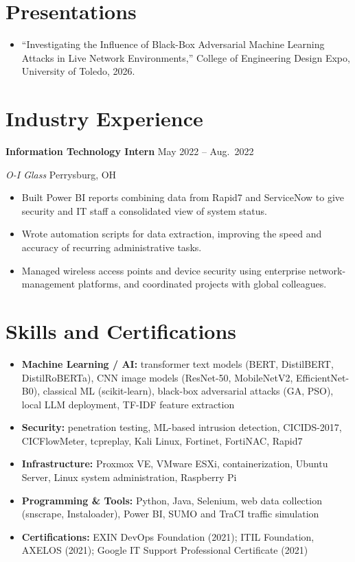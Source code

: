 \documentclass[11pt,letterpaper]{article}
\newcommand{\entry}[4]{%
  \textbf{#1} \hfill #2\par
  \textit{#3} \hfill #4\par\vspace{1pt}}
\begin{document}
\section{Presentations}
\begin{itemize}
  \item ``Investigating the Influence of Black-Box Adversarial Machine Learning Attacks
        in Live Network Environments,'' College of Engineering Design Expo,
        University of Toledo, 2026.
\end{itemize}

\section{Industry Experience}
\entry{Information Technology Intern}{May 2022 -- Aug.\ 2022}
      {O-I Glass}{Perrysburg, OH}
\begin{itemize}
  \item Built Power BI reports combining data from Rapid7 and ServiceNow to give
        security and IT staff a consolidated view of system status.
  \item Wrote automation scripts for data extraction, improving the speed and
        accuracy of recurring administrative tasks.
  \item Managed wireless access points and device security using enterprise
        network-management platforms, and coordinated projects with global colleagues.
\end{itemize}

\section{Skills and Certifications}
\begin{itemize}
  \item \textbf{Machine Learning / AI:} transformer text models (BERT, DistilBERT,
        DistilRoBERTa), CNN image models (ResNet-50, MobileNetV2, EfficientNet-B0),
        classical ML (scikit-learn), black-box adversarial attacks (GA, PSO),
        local LLM deployment, TF-IDF feature extraction
  \item \textbf{Security:} penetration testing, ML-based intrusion detection,
        CICIDS-2017, CICFlowMeter, tcpreplay, Kali Linux, Fortinet, FortiNAC, Rapid7
  \item \textbf{Infrastructure:} Proxmox VE, VMware ESXi, containerization,
        Ubuntu Server, Linux system administration, Raspberry Pi
  \item \textbf{Programming \& Tools:} Python, Java, Selenium, web data collection
        (snscrape, Instaloader), Power BI, SUMO and TraCI traffic simulation
  \item \textbf{Certifications:} EXIN DevOps Foundation (2021); ITIL Foundation,
        AXELOS (2021); Google IT Support Professional Certificate (2021)
\end{itemize}
\end{document}
